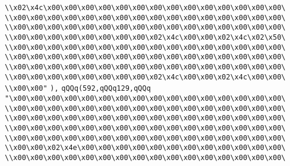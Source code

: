 \verb|\\x02\x4c\x00\x00\x00\x00\x00\x00\x00\x00\x00\x00\x00\x00\x00\x00\|\newline
\verb|\\x00\x00\x00\x00\x00\x00\x00\x00\x00\x00\x00\x00\x00\x00\x00\x00\|\newline
\verb|\\x00\x00\x00\x00\x00\x00\x00\x00\x00\x00\x00\x00\x00\x00\x00\x00\|\newline
\verb|\\x00\x00\x00\x00\x00\x00\x00\x00\x02\x4c\x00\x00\x02\x4c\x02\x50\|\newline
\verb|\\x00\x00\x00\x00\x00\x00\x00\x00\x00\x00\x00\x00\x00\x00\x00\x00\|\newline
\verb|\\x00\x00\x00\x00\x00\x00\x00\x00\x00\x00\x00\x00\x00\x00\x00\x00\|\newline
\verb|\\x00\x00\x00\x00\x00\x00\x00\x00\x00\x00\x00\x00\x00\x00\x00\x00\|\newline
\verb|\\x00\x00\x00\x00\x00\x00\x00\x00\x02\x4c\x00\x00\x02\x4c\x00\x00\|\newline
\verb|\\x00\x00"|\newline
\verb|),|\newline
\verb|qQQq(592,qQQq129,qQQq|\newline
\verb|"\x00\x00\x00\x00\x00\x00\x00\x00\x00\x00\x00\x00\x00\x00\x00\x00\|\newline
\verb|\\x00\x00\x00\x00\x00\x00\x00\x00\x00\x00\x00\x00\x00\x00\x00\x00\|\newline
\verb|\\x00\x00\x00\x00\x00\x00\x00\x00\x00\x00\x00\x00\x00\x00\x00\x00\|\newline
\verb|\\x00\x00\x00\x00\x00\x00\x00\x00\x00\x00\x00\x00\x00\x00\x00\x00\|\newline
\verb|\\x00\x00\x00\x00\x00\x00\x00\x00\x00\x00\x00\x00\x00\x00\x00\x00\|\newline
\verb|\\x00\x00\x02\x4e\x00\x00\x00\x00\x00\x00\x00\x00\x00\x00\x00\x00\|\newline
\verb|\\x00\x00\x00\x00\x00\x00\x00\x00\x00\x00\x00\x00\x00\x00\x00\x00\|\newline
